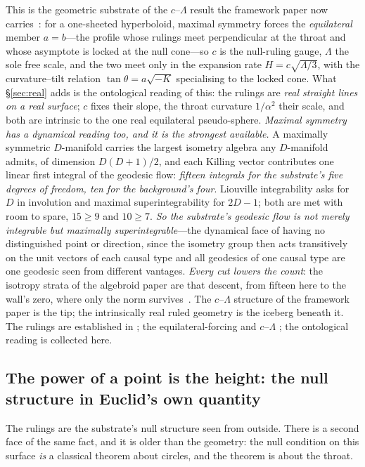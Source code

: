 \documentclass[11pt,a4paper]{article}
\theoremstyle{definition}
\begin{document}
This is the geometric substrate of the $c$--$\Lambda$ result the framework
paper now carries~\cite[\S 662-region]{JanzenCRframework}: for a one-sheeted
hyperboloid, maximal symmetry forces the \emph{equilateral} member
$a=b$---the profile whose rulings meet perpendicular at the throat and
whose asymptote is locked at the null cone---so $c$ is the null-ruling
gauge, $\Lambda$ the sole free scale, and the two meet only in the
expansion rate $H=c\sqrt{\Lambda/3}$, with the curvature--tilt relation
$\tan\theta=a\sqrt{-K}$ specialising to the locked cone. What
\S\ref{sec:real} adds is the ontological reading of this: the rulings are
\emph{real straight lines on a real surface}; $c$ fixes their slope, the
throat curvature $1/\alpha^2$ their scale, and both are intrinsic to the
one real equilateral pseudo-sphere. \emph{Maximal symmetry has a dynamical reading too, and it is the strongest available.} A maximally
symmetric $D$-manifold carries the largest isometry algebra any $D$-manifold admits, of dimension
$D(D+1)/2$, and each Killing vector contributes one linear first integral of the geodesic flow:
\emph{fifteen integrals for the substrate's five degrees of freedom, ten for the background's four}.
Liouville integrability asks for $D$ in involution and maximal superintegrability for $2D-1$; both are
met with room to spare, $15\ge9$ and $10\ge7$. \emph{So the substrate's geodesic flow is not merely
integrable but maximally superintegrable}---the dynamical face of having no distinguished point or
direction, since the isometry group then acts transitively on the unit vectors of each causal type and all
geodesics of one causal type are one geodesic seen from different vantages. \emph{Every cut lowers the count}: the isotropy strata of
the algebroid paper are that descent, from fifteen here to the wall's zero, where only the norm
survives~\cite{JanzenAlgebroid}. The $c$--$\Lambda$ structure of the
framework paper is the tip; the intrinsically real ruled geometry is the
iceberg beneath it. The rulings are established in
\cite{JanzenThesis}; the equilateral-forcing and $c$--$\Lambda$
\cite{JanzenCRframework}; the ontological reading is collected here.

\subsection{The power of a point is the height: the null structure in Euclid's own quantity}\label{sec:power}

The rulings are the substrate's null structure seen from outside. There is a
second face of the same fact, and it is older than the geometry: the null
condition on this surface \emph{is} a classical theorem about circles, and the
theorem is about the throat.
\end{document}
